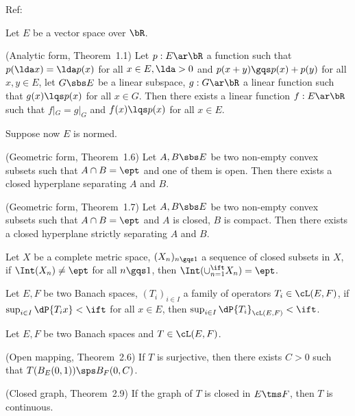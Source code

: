 \documentclass[a4paper, twoside]{article}
\begin{document}
\confighead{}{}{}



Ref:~\cite{Brezis2011}


\begin{thm}
    Let $E$ be a vector space over $\bR$.
    \begin{enr}[label=(\arabic*)]
        \item (Analytic form, Theorem~1.1) Let $p:E\ar\bR$ a function such that $p(\lda x)=\lda p(x)$ for all $x\in E,\lda>0$ and $p(x+y)\gqs p(x)+p(y)$ for all $x,y\in E$, let $G\sbs E$ be a linear subspace, $g:G\ar\bR$ a linear function such that $g(x)\lqs p(x)$ for all $x\in G$. Then there exists a linear function $f:E\ar\bR$ such that $f|_{G}=g|_{G}$ and $f(x)\lqs p(x)$ for all $x\in E$.


        Suppose now $E$ is normed.
        \item (Geometric form, Theorem~1.6) Let $A,B\sbs E$ be two non-empty convex subsets such that $A\cap B=\ept$ and one of them is open. Then there exists a closed hyperplane separating $A$ and $B$.
        \item (Geometric form, Theorem~1.7) Let $A,B\sbs E$ be two non-empty convex subsets such that $A\cap B=\ept$ and $A$ is closed, $B$ is compact. Then there exists a closed hyperplane strictly separating $A$ and $B$.
    \end{enr}

\end{thm}

\begin{thm}
    Let $X$ be a complete metric space, $(X_{n})_{n\gqs1}$ a sequence of closed subsets in $X$, if $\Int(X_{n})\neq\ept$ for all $n\gqs1$, then $\Int(\cup_{n=1}^{\ift}X_{n})=\ept$.
\end{thm}

\begin{thm}
    Let $E,F$ be two Banach spaces, $(T_{i})_{i\in I}$ a family of operators $T_{i}\in\cL(E,F)$, if $\sup_{i\in I}\dP{T_{i}x}<\ift$ for all $x\in E$, then $\sup_{i\in I}\dP{T_{i}}_{\cL(E,F)}<\ift$.
\end{thm}

\begin{thm}[]
    Let $E,F$ be two Banach spaces and $T\in\cL(E,F)$.
    \begin{enr}[label=(\arabic*)]
        \item (Open mapping, Theorem~2.6) If $T$ is surjective, then there exists $C>0$ such that $T(B_{E}(0,1))\sps B_{F}(0,C)$.
        \item (Closed graph, Theorem~2.9) If the graph of $T$ is closed in $E\tms F$, then $T$ is continuous.
    \end{enr}
\end{thm}
\end{document}
